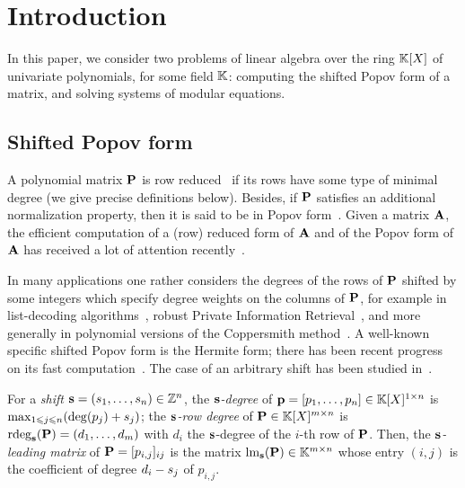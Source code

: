 \documentclass[preprint]{sig-alternate-05-2015}
\begin{document}
\vspace{-0.15cm}

\section{Introduction}
\label{sec:intro}

In this paper, we consider two problems of linear algebra over the ring
$\polRing$ of univariate polynomials, for some field $\field$: computing the
shifted Popov form of a matrix, and solving systems of modular equations.

\subsection{Shifted Popov form}
\label{subsec:popov}

A polynomial matrix $\mat{P}$ is row reduced~\cite[Section~6.3.2]{Kailath80} if
its rows have some type of minimal degree (we give precise definitions below).
Besides, if $\mat{P}$ satisfies an additional normalization property, then it
is said to be in Popov form~\cite[Section~6.7.2]{Kailath80}. Given a matrix
$\mat{A}$, the efficient computation of a (row) reduced form of $\mat{A}$ and
of the Popov form of $\mat{A}$ has received a lot of attention
recently~\cite{GiJeVi03,SarSto11,GuSaStVa12}.

In many applications one rather considers the degrees of the rows of $\mat{P}$
shifted by some integers which specify degree weights on the columns of
$\mat{P}$, for example in list-decoding
algorithms~\cite{Alekhnovich05,Busse08}, robust Private Information
Retrieval~\cite{DeGoHe12}, and more generally in polynomial versions of the
Coppersmith method~\cite{CohHen12,CohHen15}. A well-known specific shifted
Popov form is the Hermite form; there has been recent progress on its fast
computation~\cite{GupSto11,Gupta11,ZhoLab16}. The case of an arbitrary shift
has been studied in~\cite{BeLaVi06}.

For a \emph{shift} $\shifts = (\shift{1},\ldots,\shift{\cdim}) \in
\shiftSpace[\cdim]$, the \emph{$\shifts$-degree} of $\row{p} =
[p_1,\ldots,p_\cdim] \in \polMatSpace[1][\cdim]$ is $\max_{1\le j\le \cdim}
(\deg(p_j) + \shift{j})$; the \emph{$\shifts$-row degree} of $\mat{P} \in
\polMatSpace[\rdim][\cdim]$ is $\rdeg[\shifts]{\mat{P}} = (d_1,\ldots,d_\rdim)$
with $d_i$ the $\shifts$-degree of the $i$-th row of $\mat{P}$. Then, the
\emph{$\shifts$-leading matrix} of $\mat{P} = [p_{i,j}]_{ij}$ is the matrix
$\leadingMat[\shifts]{\mat{P}} \in \matSpace[\rdim][\cdim]$ whose entry $(i,j)$
is the coefficient of degree $d_i - \shift{j}$ of $p_{i,j}$.
\end{document}
